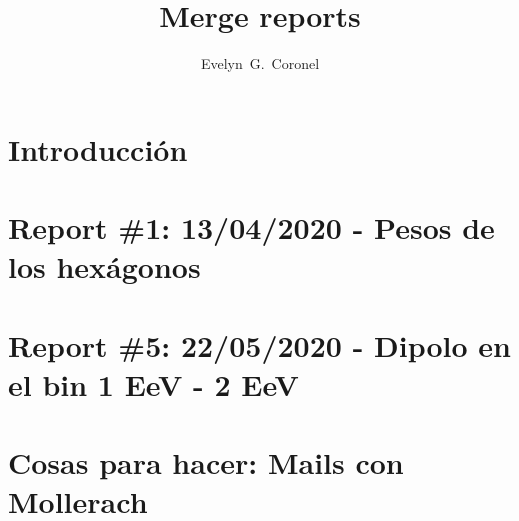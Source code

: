 \documentclass[singlespace]{ibtesis}
\title{Merge reports}
\author{Evelyn~G.~Coronel}
\begin{document}
\chapter{Introducción}
\graphicspath{{report_0_Introduccion/}}


\chapter{Report \#1: 13/04/2020 - Pesos de los hexágonos}
\graphicspath{{report_1_13_04_2020/}}


% 

% 

% 

\chapter{Report \#5: 22/05/2020 - Dipolo en el bin 1 EeV - 2 EeV}
\graphicspath{{report_5_22_05_2020/}}



\appendix
\chapter{Cosas para hacer:  Mails con Mollerach}

\end{document}
